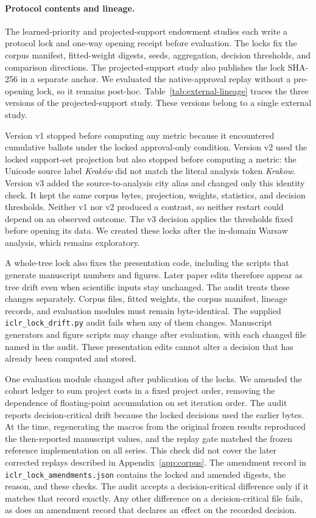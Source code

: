 \paragraph{Protocol contents and lineage.}
The learned-priority and projected-support endowment studies each write a
protocol lock and one-way opening receipt before evaluation. The locks fix the
corpus manifest, fitted-weight digests, seeds, aggregation, decision thresholds,
and comparison directions. The projected-support study also publishes the lock
SHA-256 in a separate anchor. We evaluated the native-approval replay without
a pre-opening lock, so it remains post-hoc. Table~\ref{tab:external-lineage}
traces the three versions of the projected-support study. These versions
belong to a single external study.

Version v1 stopped before computing any metric because it encountered
cumulative ballots under the locked approval-only condition. Version v2 used
the locked support-set projection but also stopped before computing a metric:
the Unicode source label \emph{Kraków} did not match the literal analysis token
\emph{Krakow}. Version v3 added the source-to-analysis city alias and changed
only this identity check. It kept the same corpus bytes, projection, weights,
statistics, and decision thresholds. Neither v1 nor v2 produced a contrast, so
neither restart could depend on an observed outcome. The v3 decision applies
the thresholds fixed before opening its data. We created these locks after
the in-domain Warsaw analysis, which remains exploratory.

A whole-tree lock also fixes the presentation code, including the scripts that
generate manuscript numbers and figures. Later paper edits therefore appear
as tree drift even when scientific inputs stay unchanged. The audit treats
these changes separately. Corpus files, fitted weights, the corpus manifest,
lineage records, and evaluation modules must remain byte-identical. The
supplied \texttt{iclr\_lock\_drift.py} audit fails when any of them changes.
Manuscript generators and figure scripts may change after evaluation, with
each changed file named in the audit. These presentation edits cannot alter a
decision that has already been computed and stored.

One evaluation module changed after publication of the locks. We amended the
cohort ledger to sum project costs in a fixed project order, removing the
dependence of floating-point accumulation on set iteration order. The audit
reports decision-critical drift because the locked decisions used the earlier
bytes. At the time, regenerating the macros from the original frozen results
reproduced the then-reported manuscript values, and the replay gate matched
the frozen reference implementation on all \NumSeriesTotal{} series.
This check did not cover the later corrected replays described in
Appendix~\ref{app:corpus}. The amendment record in \texttt{iclr\_lock\_amendments.json} contains
the locked and amended digests, the reason, and these checks. The audit accepts
a decision-critical difference only if it matches that record exactly. Any
other difference on a decision-critical file fails, as does an amendment
record that declares an effect on the recorded decision.

